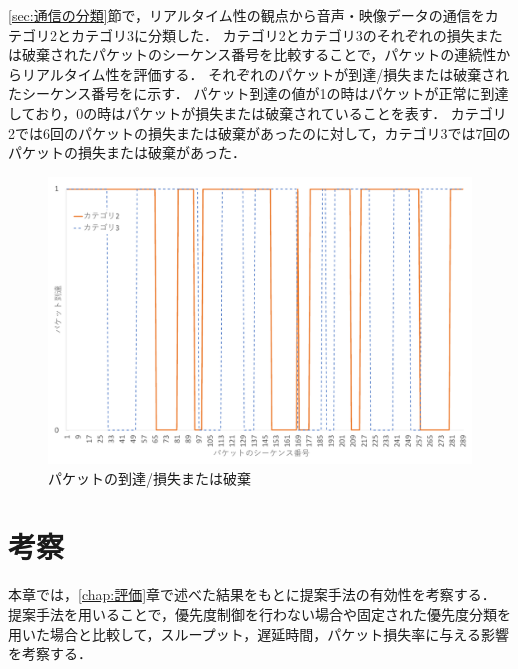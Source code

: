 \documentclass[a4paper,11pt,uplatex]{ujreport}
\begin{document}
  \ref{sec:通信の分類}節で，リアルタイム性の観点から音声・映像データの通信をカテゴリ2とカテゴリ3に分類した．
  カテゴリ2とカテゴリ3のそれぞれの損失または破棄されたパケットのシーケンス番号を比較することで，パケットの連続性からリアルタイム性を評価する．
  それぞれのパケットが到達/損失または破棄されたシーケンス番号をに示す．
  パケット到達の値が1の時はパケットが正常に到達しており，0の時はパケットが損失または破棄されていることを表す．
  カテゴリ2では6回のパケットの損失または破棄があったのに対して，カテゴリ3では7回のパケットの損失または破棄があった．

  \begin{figure}[tb]
    \centering
    \includegraphics[width=0.85\linewidth]{img/realtime.pdf}
    \caption{パケットの到達/損失または破棄}
    \label{fig:realtime}
  \end{figure}


\chapter{考察}
\label{chap:考察}

  本章では，\ref{chap:評価}章で述べた結果をもとに提案手法の有効性を考察する．
  提案手法を用いることで，優先度制御を行わない場合や固定された優先度分類を用いた場合と比較して，スループット，遅延時間，パケット損失率に与える影響を考察する．\par
\end{document}
